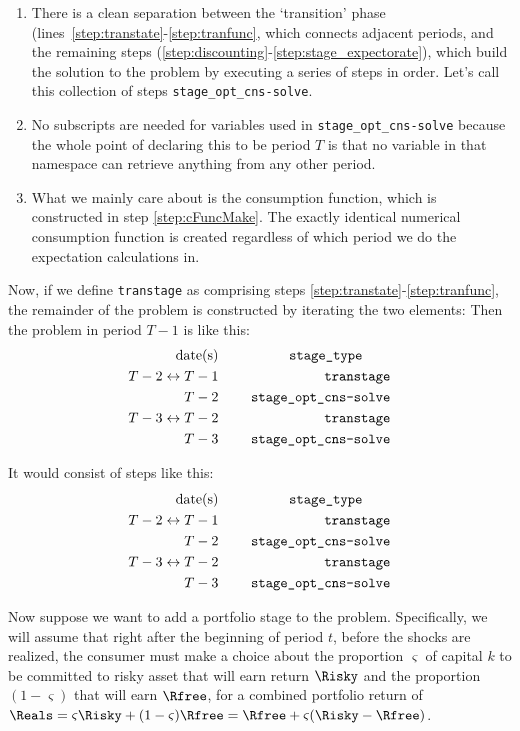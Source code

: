 \documentclass[\econtexRoot/BufferStockTheory]{subfiles}
\begin{document}
\begin{enumerate}
\item There is a clean separation between the `transition' phase (lines~\ref{step:transtate}-\ref{step:tranfunc}, which connects adjacent periods, and the remaining steps (\ref{step:discounting}-\ref{step:stage_expectorate}), which build the solution to the problem by executing a series of steps in order.  Let's call this collection of steps \texttt{stage\_opt\_cns-solve}.
\item No subscripts are needed for variables used in \texttt{stage\_opt\_cns-solve} because the whole point of declaring this to be period $T$ is that no variable in that namespace can retrieve anything from any other period.
  \item What we mainly care about is the consumption function, which is constructed in step \ref{step:cFuncMake}.  The exactly identical numerical consumption function is created regardless of which period we do the expectation calculations in.
  \end{enumerate}


  Now, if we define \texttt{transtage} as comprising steps \ref{step:transtate}-\ref{step:tranfunc}, the remainder of the problem is constructed by iterating the two elements:
Then the problem in period $T-1$ is like this:
\begin{alignat}{3}
\text{date(s)}              &      &   \notag       \qquad \texttt{stage\_type} \qquad
\\ T-2\leftrightarrow T-1 & ~~~~ & \text{\texttt{transtage}}
\\ T-2 & ~~~~ & \text{\texttt{stage\_opt\_cns-solve}}
\\ T-3\leftrightarrow T-2 & ~~~~ & \text{\texttt{transtage}}
\\ T-3 & ~~~~ & \text{\texttt{stage\_opt\_cns-solve}}
\end{alignat}

It would consist of steps like this:
\begin{alignat}{3}
\text{date(s)}              &      &   \notag       \qquad \texttt{stage\_type} \qquad
\\ T-2\leftrightarrow T-1 & ~~~~ & \text{\texttt{transtage}}
\\ T-2 & ~~~~ & \text{\texttt{stage\_opt\_cns-solve}}
\\ T-3\leftrightarrow T-2 & ~~~~ & \text{\texttt{transtage}}
\\ T-3 & ~~~~ & \text{\texttt{stage\_opt\_cns-solve}}
\end{alignat}

Now suppose we want to add a portfolio stage to the problem.  Specifically, we will assume that right after the beginning of period $t$, before the shocks are realized, the consumer must make a choice about the proportion $\varsigma$ of capital $k$ to be committed to risky asset that will earn return $\Risky$ and the proportion $(1-\varsigma)$ that will earn $\Rfree$, for a combined portfolio return of $\Reals=\varsigma \Risky + (1-\varsigma)\Rfree = \Rfree+\varsigma(\Risky-\Rfree)$.
\end{document}
